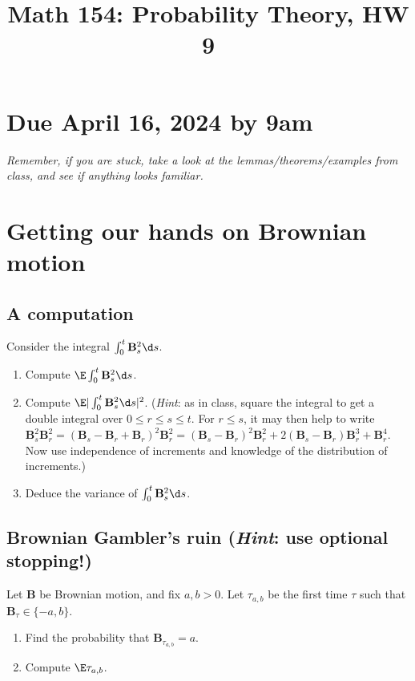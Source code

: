 \documentclass[12pt,reqno]{amsart}
\title{\Large Math 154: Probability Theory, HW 9\vspace{-0.1cm}}
\theoremstyle{definition}
\theoremstyle{remark}
\numberwithin{equation}{section}
\newenvironment{nouppercase}{%
  \let\uppercase\relax%
  \renewcommand{\uppercasenonmath}[1]{}}{}
\begin{document}
\begin{nouppercase}
\maketitle
\end{nouppercase}
\section*{Due April 16, 2024 by 9am}
\emph{Remember, if you are stuck, take a look at the lemmas/theorems/examples from class, and see if anything looks familiar.}
\section{Getting our hands on Brownian motion}
\subsection{A computation}
Consider the integral $\int_{0}^{t}\mathbf{B}_{s}^{2}\d s$.
\begin{enumerate}
\item Compute $\E\int_{0}^{t}\mathbf{B}_{s}^{2}\d s$.
\item Compute $\E|\int_{0}^{t}\mathbf{B}_{s}^{2}\d s|^{2}$. (\emph{Hint}: as in class, square the integral to get a double integral over $0\leq r\leq s\leq t$. For $r\leq s$, it may then help to write $\mathbf{B}_{s}^{2}\mathbf{B}_{r}^{2}=(\mathbf{B}_{s}-\mathbf{B}_{r}+\mathbf{B}_{r})^{2}\mathbf{B}_{r}^{2}=(\mathbf{B}_{s}-\mathbf{B}_{r})^{2}\mathbf{B}_{r}^{2}+2(\mathbf{B}_{s}-\mathbf{B}_{r})\mathbf{B}_{r}^{3}+\mathbf{B}_{r}^{4}$. Now use independence of increments and knowledge of the distribution of increments.)
\item Deduce the variance of $\int_{0}^{t}\mathbf{B}_{s}^{2}\d s$.
\end{enumerate}
\subsection{Brownian Gambler's ruin (\emph{Hint}: use optional stopping!)}
Let $\mathbf{B}$ be Brownian motion, and fix $a,b>0$. Let $\tau_{a,b}$ be the first time $\tau$ such that $\mathbf{B}_{\tau}\in\{-a,b\}$.
\begin{enumerate}
\item Find the probability that $\mathbf{B}_{\tau_{a,b}}=a$.
\item Compute $\E\tau_{a,b}$.
\end{enumerate}
\end{document}
